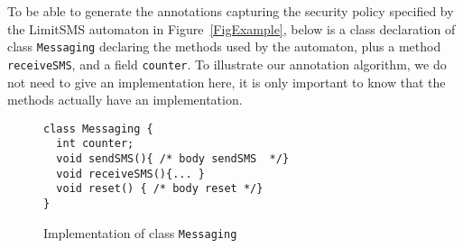 To be able to generate the annotations capturing the security policy
specified by the LimitSMS automaton in Figure~\ref{FigExample}, below
is a class declaration of class \texttt{Messaging} declaring the
methods used by the automaton, plus a method \texttt{receiveSMS}, and
a field \texttt{counter}. To illustrate our annotation algorithm, we
do not need to give an implementation here, it is only important to
know that the methods actually have an implementation.
\begin{figure}[t]
\begin{verbatim}
class Messaging {
  int counter;
  void sendSMS(){ /* body sendSMS  */}
  void receiveSMS(){... }
  void reset() { /* body reset */}
}
\end{verbatim}
\caption{Implementation of class \texttt{Messaging}}\label{FigExampleImplem}
\end{figure}









